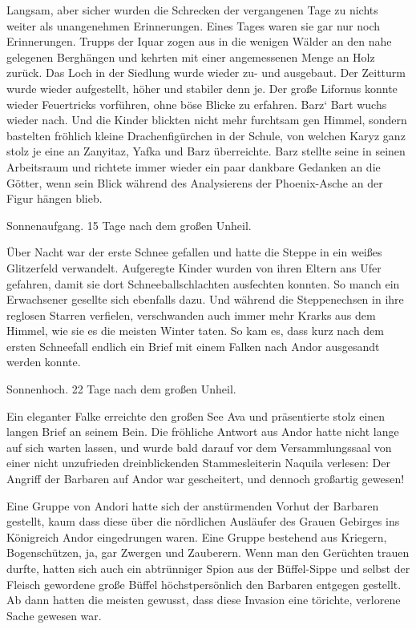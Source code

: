 Langsam, aber sicher wurden die Schrecken der vergangenen Tage zu nichts weiter als unangenehmen Erinnerungen. Eines Tages waren sie gar nur noch Erinnerungen. Trupps der Iquar zogen aus in die wenigen Wälder an den nahe gelegenen Berghängen und kehrten mit einer angemessenen Menge an Holz zurück. Das Loch in der Siedlung wurde wieder zu- und ausgebaut. Der Zeitturm wurde wieder aufgestellt, höher und stabiler denn je. Der große Lifornus konnte wieder Feuertricks vorführen, ohne böse Blicke zu erfahren. Barz‘ Bart wuchs wieder nach. Und die Kinder blickten nicht mehr furchtsam gen Himmel, sondern bastelten fröhlich kleine Drachenfigürchen in der Schule, von welchen Karyz ganz stolz je eine an Zanyitaz, Yafka und Barz überreichte. Barz stellte seine in seinen Arbeitsraum und richtete immer wieder ein paar dankbare Gedanken an die Götter, wenn sein Blick während des Analysierens der Phoenix-Asche an der Figur hängen blieb.



\trennzeichen



Sonnenaufgang. 15 Tage nach dem großen Unheil.\bigskip



Über Nacht war der erste Schnee gefallen und hatte die Steppe in ein weißes Glitzerfeld verwandelt. Aufgeregte Kinder wurden von ihren Eltern ans Ufer gefahren, damit sie dort Schneeballschlachten ausfechten konnten. So manch ein Erwachsener gesellte sich ebenfalls dazu. Und während die Steppenechsen in ihre reglosen Starren verfielen, verschwanden auch immer mehr Krarks aus dem Himmel, wie sie es die meisten Winter taten. So kam es, dass kurz nach dem ersten Schneefall endlich ein Brief mit einem Falken nach Andor ausgesandt werden konnte.



\trennzeichen



Sonnenhoch. 22 Tage nach dem großen Unheil.\bigskip



Ein eleganter Falke erreichte den großen See Ava und präsentierte stolz einen langen Brief an seinem Bein. Die fröhliche Antwort aus Andor hatte nicht lange auf sich warten lassen, und wurde bald darauf vor dem Versammlungssaal von einer nicht unzufrieden dreinblickenden Stammesleiterin Naquila verlesen: Der Angriff der Barbaren auf Andor war gescheitert, und dennoch großartig gewesen!

Eine Gruppe von Andori hatte sich der anstürmenden Vorhut der Barbaren gestellt, kaum dass diese über die nördlichen Ausläufer des Grauen Gebirges ins Königreich Andor eingedrungen waren. Eine Gruppe bestehend aus Kriegern, Bogenschützen, ja, gar Zwergen und Zauberern. Wenn man den Gerüchten trauen durfte, hatten sich auch ein abtrünniger Spion aus der Büffel-Sippe und selbst der Fleisch gewordene große Büffel höchstpersönlich den Barbaren entgegen gestellt. Ab dann hatten die meisten gewusst, dass diese Invasion eine törichte, verlorene Sache gewesen war.

